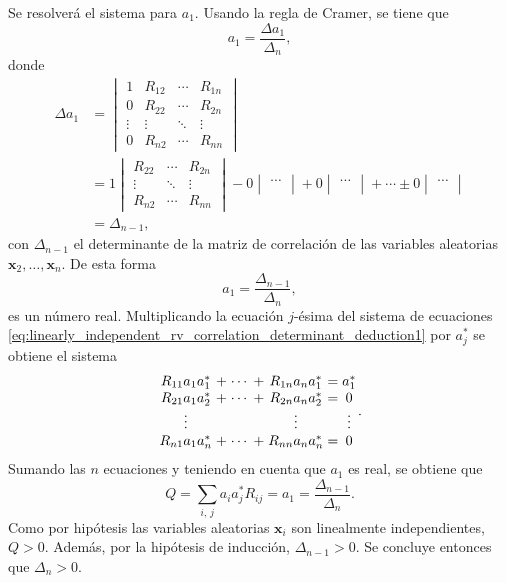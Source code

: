\documentclass[a4paper]{report}
\newcommand{\x}{\mathbf{x}}
\begin{document}
\begin{itemize}
\begin{itemize}
 Se resolverá el sistema para \(a_1\). Usando la regla de Cramer, se tiene que
  \[
   a_1=\frac{\Delta a_1}{\Delta_n},
  \]
  donde
  \begin{align*}
  \Delta a_1&=
  \begin{vmatrix}
      1 & R_{12} & \cdots & R_{1n}\\
      0 & R_{22} & \cdots & R_{2n}\\
      \vdots & \vdots & \ddots & \vdots\\
      0 & R_{n2} & \cdots & R_{nn}
  \end{vmatrix}\\
   &=1\begin{vmatrix}
      R_{22} & \cdots & R_{2n}\\
      \vdots & \ddots & \vdots\\
      R_{n2} & \cdots & R_{nn}
    \end{vmatrix}
    -0\begin{vmatrix}
       \cdots \\
    \end{vmatrix}
    +0\begin{vmatrix}
       \cdots \\
    \end{vmatrix}+\cdots
    \pm0\begin{vmatrix}
       \cdots \\
    \end{vmatrix}\\
    &=\Delta_{n-1},
  \end{align*}
  con \(\Delta_{n-1}\) el determinante de la matriz de correlación de las variables aleatorias \(\x_2,\dots,\x_n\). De esta forma
  \[
   a_1=\frac{\Delta_{n-1}}{\Delta_n},
  \]
  es un número real.
  Multiplicando la ecuación \(j\)-ésima del sistema de ecuaciones 
  \ref{eq:linearly_independent_rv_correlation_determinant_deduction1} por \(a_j^*\) se obtiene el sistema
  \[
   \arraycolsep=1.4pt
  \begin{array}{ccccccc}
    R_{11}a_1a^*_1&+&\cdots&+&R_{1n}a_na^*_1&=&a^*_1\\
    R_{21}a_1a^*_2&+&\cdots&+&R_{2n}a_na^*_2&=&0\\
    \vdots& & & &\vdots& &\vdots\\
    R_{n1}a_1a^*_n&+&\cdots&+&R_{nn}a_na^*_n&=&0
  \end{array}.
  \]
  Sumando las \(n\) ecuaciones y teniendo en cuenta que \(a_1\) es real, se obtiene que
  \[
   Q=\sum_{i,\,j}a_ia_j^*R_{ij}=a_1=\frac{\Delta_{n-1}}{\Delta_n}.
  \]
  Como por hipótesis las variables aleatorias \(\x_i\) son linealmente independientes, \(Q>0\). Además, por la hipótesis de inducción, \(\Delta_{n-1}>0\). Se concluye entonces que \(\Delta_n>0\).

\end{itemize}
\end{itemize}
\end{document}
